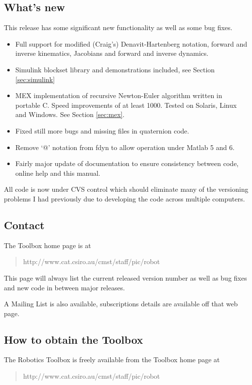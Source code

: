 \documentclass{article}
\newcommand{\var}[1]{{\vtt #1}}
\begin{document}
\subsection{What's new}
This release has some significant new functionality as well as some
bug fixes.
\begin{itemize}
\item	Full support for modified (Craig's) Denavit-Hartenberg notation,
	forward and inverse kinematics, Jacobians and forward and inverse
	dynamics.
\item	Simulink blockset library and demonstrations included, see Section
	\ref{sec:simulink}
\item	MEX implementation of recursive Newton-Euler algorithm written in
	portable C.  Speed improvements of at least 1000.  Tested on Solaris,
	Linux and Windows. See Section \ref{sec:mex}.
\item	Fixed still more bugs and missing files in quaternion code.
\item	Remove `@' notation from \var{fdyn} to allow operation under
	Matlab 5 and 6.
\item	Fairly major update of documentation to ensure consistency between
	code, online help and this manual.
\end{itemize}

All code is now under CVS control which should eliminate many of the
versioning problems I had previously due to developing the code across 
multiple computers.

\subsection{Contact}
The Toolbox home page is at
\begin{quote}
http://www.cat.csiro.au/cmst/staff/pic/robot
\end{quote}
This page will always list the current released version number as well as
bug fixes and new code in between major releases. 

A Mailing List is also available, subscriptions details are available
off that web page.

\subsection{How to obtain the Toolbox}
The Robotics Toolbox is freely available from the Toolbox home
page at 
\begin{quote}
http://www.cat.csiro.au/cmst/staff/pic/robot
\end{quote}
\end{document}
